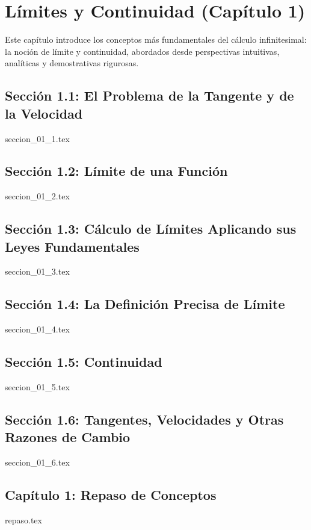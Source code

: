 \chapter{Límites y Continuidad (Capítulo 1)}
\label{cap:limites_y_continuidad}

Este capítulo introduce los conceptos más fundamentales del cálculo infinitesimal: la noción de límite y continuidad, abordados desde perspectivas intuitivas, analíticas y demostrativas rigurosas.

\section{Sección 1.1: El Problema de la Tangente y de la Velocidad}
{seccion_01_1.tex}

\section{Sección 1.2: Límite de una Función}
{seccion_01_2.tex}

\section{Sección 1.3: Cálculo de Límites Aplicando sus Leyes Fundamentales}
{seccion_01_3.tex}

\section{Sección 1.4: La Definición Precisa de Límite}
{seccion_01_4.tex}

\section{Sección 1.5: Continuidad}
{seccion_01_5.tex}

\section{Sección 1.6: Tangentes, Velocidades y Otras Razones de Cambio}
{seccion_01_6.tex}

\section{Capítulo 1: Repaso de Conceptos}
{repaso.tex}
